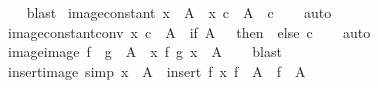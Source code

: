 \begin{isabellebody}
\ \ %
\endisadelimproof
%
\isatagproof
{}\isamarkupfalse%
\ blast%
\endisatagproof
{\isafoldproof}%
%
\isadelimproof
\isanewline
%
\endisadelimproof
\isanewline
{}\isamarkupfalse%
\ image{\isacharunderscore}{\kern0pt}constant{\isacharcolon}{\kern0pt}\ {\isachardoublequoteopen}x\ {\isasymin}\ A\ {\isasymLongrightarrow}\ {\isacharparenleft}{\kern0pt}{\isasymlambda}x{\isachardot}{\kern0pt}\ c{\isacharparenright}{\kern0pt}\ {\isacharbackquote}{\kern0pt}\ A\ {\isacharequal}{\kern0pt}\ {\isacharbraceleft}{\kern0pt}c{\isacharbraceright}{\kern0pt}{\isachardoublequoteclose}\isanewline
%
\isadelimproof
\ \ %
\endisadelimproof
%
\isatagproof
{}\isamarkupfalse%
\ auto%
\endisatagproof
{\isafoldproof}%
%
\isadelimproof
\isanewline
%
\endisadelimproof
\isanewline
{}\isamarkupfalse%
\ image{\isacharunderscore}{\kern0pt}constant{\isacharunderscore}{\kern0pt}conv{\isacharcolon}{\kern0pt}\ {\isachardoublequoteopen}{\isacharparenleft}{\kern0pt}{\isasymlambda}x{\isachardot}{\kern0pt}\ c{\isacharparenright}{\kern0pt}\ {\isacharbackquote}{\kern0pt}\ A\ {\isacharequal}{\kern0pt}\ {\isacharparenleft}{\kern0pt}if\ A\ {\isacharequal}{\kern0pt}\ {\isacharbraceleft}{\kern0pt}{\isacharbraceright}{\kern0pt}\ then\ {\isacharbraceleft}{\kern0pt}{\isacharbraceright}{\kern0pt}\ else\ {\isacharbraceleft}{\kern0pt}c{\isacharbraceright}{\kern0pt}{\isacharparenright}{\kern0pt}{\isachardoublequoteclose}\isanewline
%
\isadelimproof
\ \ %
\endisadelimproof
%
\isatagproof
{}\isamarkupfalse%
\ auto%
\endisatagproof
{\isafoldproof}%
%
\isadelimproof
\isanewline
%
\endisadelimproof
\isanewline
{}\isamarkupfalse%
\ image{\isacharunderscore}{\kern0pt}image{\isacharcolon}{\kern0pt}\ {\isachardoublequoteopen}f\ {\isacharbackquote}{\kern0pt}\ {\isacharparenleft}{\kern0pt}g\ {\isacharbackquote}{\kern0pt}\ A{\isacharparenright}{\kern0pt}\ {\isacharequal}{\kern0pt}\ {\isacharparenleft}{\kern0pt}{\isasymlambda}x{\isachardot}{\kern0pt}\ f\ {\isacharparenleft}{\kern0pt}g\ x{\isacharparenright}{\kern0pt}{\isacharparenright}{\kern0pt}\ {\isacharbackquote}{\kern0pt}\ A{\isachardoublequoteclose}\isanewline
%
\isadelimproof
\ \ %
\endisadelimproof
%
\isatagproof
{}\isamarkupfalse%
\ blast%
\endisatagproof
{\isafoldproof}%
%
\isadelimproof
\isanewline
%
\endisadelimproof
\isanewline
{}\isamarkupfalse%
\ insert{\isacharunderscore}{\kern0pt}image\ {\isacharbrackleft}{\kern0pt}simp{\isacharbrackright}{\kern0pt}{\isacharcolon}{\kern0pt}\ {\isachardoublequoteopen}x\ {\isasymin}\ A\ {\isasymLongrightarrow}\ insert\ {\isacharparenleft}{\kern0pt}f\ x{\isacharparenright}{\kern0pt}\ {\isacharparenleft}{\kern0pt}f\ {\isacharbackquote}{\kern0pt}\ A{\isacharparenright}{\kern0pt}\ {\isacharequal}{\kern0pt}\ f\ {\isacharbackquote}{\kern0pt}\ A{\isachardoublequoteclose}\isanewline

\end{isabellebody}
